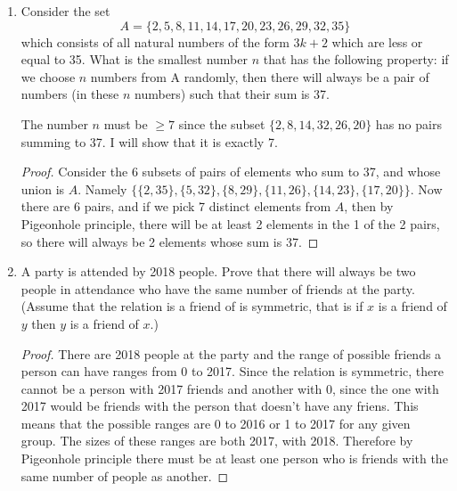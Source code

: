 \documentclass{article}
\begin{document}
\begin{enumerate}
\begin{proof}
Second, consider the case when there isn't an element with more than 13 hours walked, then let $W$ be the set of sequences of $\{\{w_1\}, \{w_1, w_2\}, \dots \{w_1,\dots , w_{29}\}\}$, so the first 29 sequences. Then consider the remainders of the sum of the sequences mod 14. There are 14 possible remainders: 0, 1, $\dots$, 13. Since $29 = 2(14) + 1$, by Pigeonhole principle, there must be at least 3 elements with the same remainder. But from 0 to 30, there are can only be 3 elements with the same remainder mod 14, since 3(14) = 42. This means that subtracting one of those from the other will result in exactly 14, and subtracting one of these sequences from another, will give another valid sequence, and its length is exactly 14, which has length $>$ 1 since no element is greater than 14.
\end{proof}

\item Consider the set
\[
 A = \{2,5,8,11,14,17,20,23,26,29,32,35\}
\]
which consists of all natural numbers of the form $3k + 2$ which are less or equal to 35. What is the smallest number $n$ that has the following property: if we choose $n$ numbers from A randomly, then there will always be a pair of numbers (in these $n$ numbers) such that their sum is 37.

The number $n$ must be $\geq 7$ since the subset $\{2,8,14,32,26,20\}$ has no pairs summing to 37. I will show that it is exactly 7.

\begin{proof}
    Consider the 6 subsets of pairs of elements who sum to 37, and whose union is $A$. Namely $\{ \{2,35\}, \{5,32\}, \{8,29\}, \{11,26\},\{14,23\}, \{17,20\} \}$. Now there are 6 pairs, and if we pick 7 distinct elements from $A$, then by Pigeonhole principle, there will be at least 2 elements in the 1 of the 2 pairs, so there will always be 2 elements whose sum is 37.
\end{proof}


\item A party is attended by 2018 people. Prove that there will always be two people in attendance who have the same number of friends at the party. (Assume that the relation is a friend of is symmetric, that is if $x$ is a friend of $y$ then $y$ is a friend of $x$.)

\begin{proof}
There are 2018 people at the party and the range of possible friends a person can have ranges from 0 to 2017. Since the relation is symmetric, there cannot be a person with 2017 friends and another with 0, since the one with 2017 would be friends with the person that doesn't have any friens. This means that the possible ranges are 0 to 2016 or 1 to 2017 for any given group. The sizes of these ranges are both 2017, with 2018. Therefore by Pigeonhole principle there must be at least one person who is friends with the same number of people as another.
\end{proof}
\end{enumerate}
\end{document}
